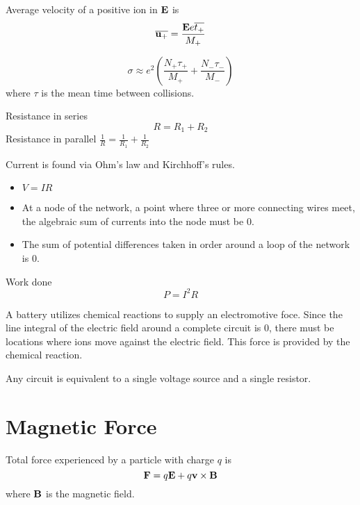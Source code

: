 \documentclass[a4paper]{article}
\begin{document}
\begin{prp} Average velocity of a positive ion in $\vb{E}$ is $$\overline{\vb{u}_+}=\frac{\vb{E}e\overline{t_+}}{M_+}$$
\end{prp}

\begin{prp} $$\sigma\approx e^2\left(\frac{N_+\tau_+}{M_+}+\frac{N_-\tau_-}{M_-}\right)$$ where $\tau$ is the mean time between collisions. 
\end{prp}

\begin{thm} Resistance in series $$R=R_1+R_2$$ Resistance in parallel $\frac{1}{R}=\frac{1}{R_1}+\frac{1}{R_2}$
\end{thm}

\begin{thm} Current is found via Ohm's law and Kirchhoff's rules. 
\begin{itemize}
\item $V=IR$
\item At a node of the network, a point where three or more connecting wires meet, the algebraic sum of currents into the node must be $0$. 
\item The sum of potential differences taken in order around a loop of the network is $0$. 
\end{itemize}
\end{thm}

\begin{thm} Work done $$P=I^2R$$
\end{thm}

\begin{thm} A battery utilizes chemical reactions to supply an electromotive foce. Since the line integral of the electric field around a complete circuit is $0$, there must be locations where ions move against the electric field. This force is provided by the chemical reaction. 
\end{thm}

\begin{thm} Any circuit is equivalent to a single voltage source and a single resistor. 
\end{thm}

\pagebreak
\section{Magnetic Force}
\begin{thm} Total force experienced by a particle with charge $q$ is $$\vb{F}=q\vb{E}+q\vb{v}\times\vb{B}$$ where $\vb{B}$ is the magnetic field. 
\end{thm}
\end{document}
